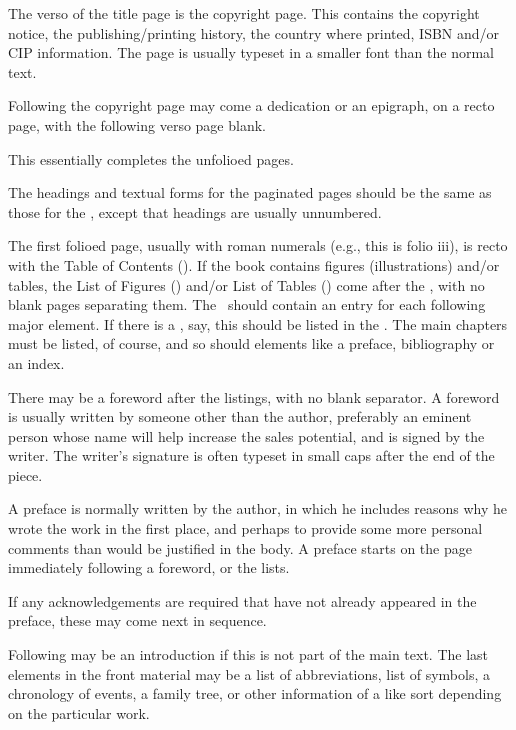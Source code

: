 \documentclass[10pt,letterpaper,extrafontsizes]{memoir}
\begin{document}
    The verso of the title page is the copyright page.
This contains the copyright notice, the publishing/printing history, 
the country where printed, ISBN and/or CIP information. The page is usually 
typeset in a smaller font than the normal text.

    Following the copyright page may come a dedication or an epigraph, 
on a recto page, with the following verso page blank.

    This essentially completes the unfolioed pages.

    The headings and textual forms for the paginated 
pages should be the same as those for the \pixmainmatter, except that 
headings are usually unnumbered.

    The first folioed page,
usually with roman numerals (e.g., this is folio iii),
is recto with the Table of Contents (\toc). If the book contains 
figures (illustrations) 
and/or tables, the List of Figures (\lof) and/or List of Tables 
(\lot) come after the \toc, with no blank pages separating them. The \toc\ 
should contain an entry for each following major element. If there is a \lot, 
say, this should be listed in the \toc. The main chapters\index{chapter} must 
be listed, of course, and so should elements like a preface\index{preface}, 
bibliography\index{bibliography} or an index\index{index}.

    There may be a foreword after the listings, with no blank
separator. A foreword is usually written by someone other than the author, 
preferably an eminent person whose name will help increase the sales potential,
and is signed by the writer. The writer's
signature is often typeset in small caps after the end of the piece.

   A preface is normally written by the author, in which he
includes reasons why he wrote the work in the first place, and perhaps to 
provide some more personal comments than would be justified in the body. 
A preface starts on the page immediately following a foreword, or the lists.

   If any acknowledgements are required that have not already appeared in the
preface, these may come next in sequence.

   Following may be an introduction if this is not part of the main text. 
The last elements in the front material may be a list of abbreviations, list
of symbols, a chronology of events, a family tree, or other information of
a like sort depending on the particular work.
\end{document}
